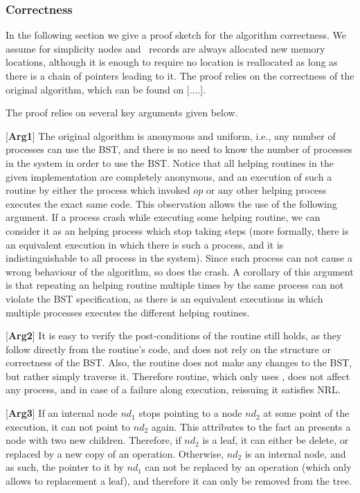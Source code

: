 \subsubsection{Correctness}

In the following section we give a proof sketch for the algorithm correctness. We assume for simplicity nodes and \Flag\ records are always allocated new memory locations, although it is enough to require no location is reallocated as long as there is a chain of pointers leading to it. The proof relies on the correctness of the original algorithm, which can be found on [....].

The proof relies on several key arguments given below.

\newcommand{\argAnonymous}{arg1}
[\textbf{Arg1}] The original algorithm is anonymous and uniform, i.e., any number of processes can use the BST, and there is no need to know the number of processes in the system in order to use the BST. Notice that all helping routines in the given implementation are completely anonymous, and an execution of such a routine by either the process which invoked $op$ or any other helping process executes the exact same code. This observation allows the use of the following argument. If a process crash while executing some helping routine, we can consider it as an helping process which stop taking steps (more formally, there is an equivalent execution in which there is such a process, and it is indistinguishable to all process in the system). Since such process can not cause a wrong behaviour of the algorithm, so does the crash. 
A corollary of this argument is that repeating an helping routine multiple times by the same process can not violate the BST specification, as there is an equivalent executions in which multiple processes executes the different helping routines.

\newcommand{\argSearch}{arg2}
[\textbf{Arg2}] It is easy to verify the post-conditions of the  routine still holds, as they follow directly from the routine's code, and does not rely on the structure or correctness of the BST. Also, the  routine does not make any changes to the BST, but rather simply traverse it. Therefore  routine, which only uses , does not affect any process, and in case of a failure along  execution, reissuing it satisfies NRL.

\newcommand{\argNodeRef}{arg3}
[\textbf{Arg3}] If an internal node $nd_1$ stops pointing to a node $nd_2$ at some point of the execution, it can not point to $nd_2$ again. This attributes to the fact an  presents a node with two new children. Therefore, if $nd_2$ is a leaf, it can either be delete, or replaced by a new copy of an  operation. Otherwise, $nd_2$ is an internal node, and as such, the pointer to it by $nd_1$ can not be replaced by an  operation (which only allows to replacement a leaf), and therefore it can only be removed from the tree.

